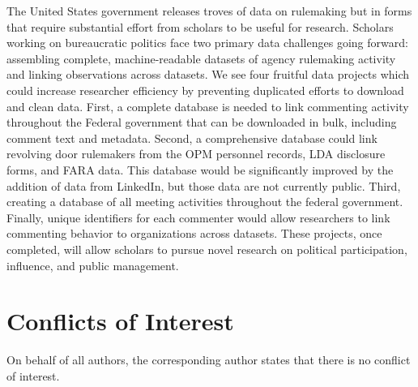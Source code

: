 \documentclass[
      12pt,
        ]{article}
\begin{document}
The United States government releases troves of data on rulemaking but
in forms that require substantial effort from scholars to be useful for
research. Scholars working on bureaucratic politics face two primary
data challenges going forward: assembling complete, machine-readable
datasets of agency rulemaking activity and linking observations across
datasets. We see four fruitful data projects which could increase
researcher efficiency by preventing duplicated efforts to download and
clean data. First, a complete database is needed to link commenting
activity throughout the Federal government that can be downloaded in
bulk, including comment text and metadata. Second, a comprehensive
database could link revolving door rulemakers from the OPM personnel
records, LDA disclosure forms, and FARA data. This database would be
significantly improved by the addition of data from LinkedIn, but those
data are not currently public. Third, creating a database of all meeting
activities throughout the federal government. Finally, unique
identifiers for each commenter would allow researchers to link
commenting behavior to organizations across datasets. These projects,
once completed, will allow scholars to pursue novel research on
political participation, influence, and public management.

\hypertarget{conflicts-of-interest}{%
\section{Conflicts of Interest}\label{conflicts-of-interest}}

On behalf of all authors, the corresponding author states that there is
no conflict of interest.
  \newpage 
  \theendnotes
\newpage
\singlespacing 
           
  
\end{document}
